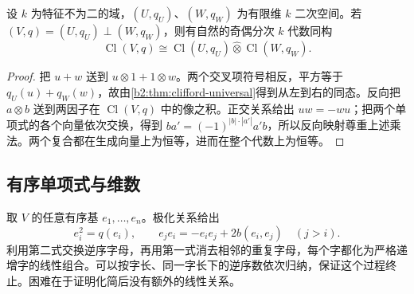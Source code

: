\begin{proposition}\label{b2:prop:B-clifford-orthogonal-sum}
	设 \(k\) 为特征不为二的域，\((U,q_U)\)、\((W,q_W)\) 为有限维 \(k\) 二次空间。若 \((V,q)=(U,q_U)\perp(W,q_W)\)，则有自然的奇偶分次 \(k\) 代数同构
	\[
		\operatorname{Cl}(V,q)\cong \operatorname{Cl}(U,q_U)\widehat\otimes\operatorname{Cl}(W,q_W).
	\]
\end{proposition}
\begin{proof}
	把 \(u+w\) 送到 \(u\otimes1+1\otimes w\)。两个交叉项符号相反，平方等于 \(q_U(u)+q_W(w)\)，故由\cref{b2:thm:clifford-universal}得到从左到右的同态。反向把 \(a\otimes b\) 送到两因子在 \(\operatorname{Cl}(V,q)\) 中的像之积。正交关系给出 \(uw=-wu\)；把两个单项式的各个向量依次交换，得到 \(ba'=(-1)^{|b|\cdot|a'|}a'b\)，所以反向映射尊重上述乘法。两个复合都在生成向量上为恒等，进而在整个代数上为恒等。
\end{proof}

\subsection{有序单项式与维数}
\label{b2:subsec:B01:02}

取 \(V\) 的任意有序基 \(e_1,\ldots,e_n\)。极化关系给出
\[
	e_i^2=q(e_i),\qquad e_je_i=-e_ie_j+2b(e_i,e_j)\quad(j>i).
\]
利用第二式交换逆序字母，再用第一式消去相邻的重复字母，每个字都化为严格递增字的线性组合。可以按字长、同一字长下的逆序数依次归纳，保证这个过程终止。困难在于证明化简后没有额外的线性关系。

